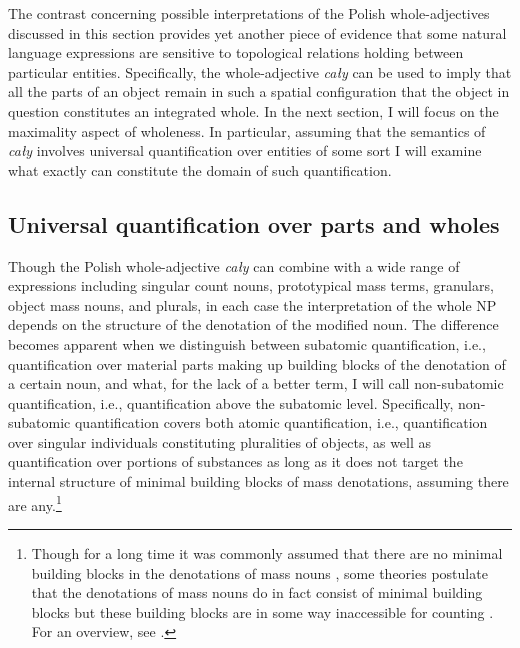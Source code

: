 The contrast concerning possible interpretations of the Polish whole-ad\-jec\-tives discussed in this section provides yet another piece of evidence that some natural language expressions are sensitive to topological relations holding between particular entities. Specifically, the whole-adjective \textit{cały} can be used to imply that all the parts of an object remain in such a spatial configuration that the object in question constitutes an integrated whole. In the next section, I will focus on the maximality aspect of wholeness. In particular, assuming that the semantics of \textit{cały} involves universal quantification over entities of some sort I will examine what exactly can constitute the domain of such quantification.

\subsection{Universal quantification over parts and wholes}\label{sec:universal-quantification-over-parts-and-wholes}

Though the Polish whole-adjective \textit{cały} can combine with a wide range of expressions including singular count nouns, prototypical mass terms, granulars, object mass nouns, and plurals, in each case the interpretation of the whole NP depends on the structure of the denotation of the modified noun. The difference becomes apparent when we distinguish between subatomic quantification, i.e., quantification over material parts making up building blocks of the denotation of a certain noun, and what, for the lack of a better term, I will call non-subatomic quantification, i.e., quantification above the subatomic level. Specifically, non-subatomic quantification covers both atomic quantification, i.e., quantification over singular individuals constituting pluralities of objects, as well as quantification over portions of substances as long as it does not target the internal structure of minimal building blocks of mass denotations, assuming there are any.\footnote{Though for a long time it was commonly assumed that there are no minimal building blocks in the denotations of mass nouns \citep[e.g.,][]{ter_meulen1980substances,link1983logical,bunt1985mass,landman1991structures}, some theories postulate that the denotations of mass nouns do in fact consist of minimal building blocks but these building blocks are in some way inaccessible for counting \citep[e.g.,][]{chierchia1998plurality,chierchia2010mass}. For an overview, see \citet{landman2011count}.} 

